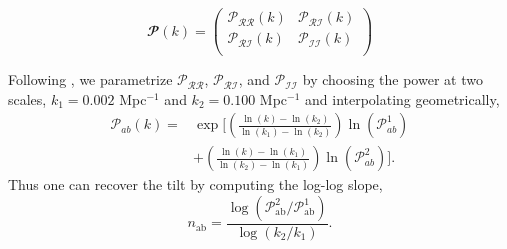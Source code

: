 \documentclass{emulateapj}
\newcommand{\prr}{ \mathcal{P}_{\mathcal{R}\mathcal{R}} }
\newcommand{\pri}{ \mathcal{P}_{\mathcal{R}\mathcal{I}} }
\newcommand{\pii}{ \mathcal{P}_{\mathcal{I}\mathcal{I}} }
\begin{document}
\begin{equation}
\mathbfcal{P}(k) = \left( {\begin{array}{cc}
   \prr(k) & \pri(k) \\
   \pri(k) &  \pii(k) \\
  \end{array} } \right)
\end{equation}

Following \cite{planckXX:2015}, we parametrize $\prr$, $\pri$, and $\pii$ by choosing the power at two scales, $k_1 = 0.002$ Mpc$^{-1}$ and $k_2 = 0.100$ Mpc$^{-1}$ and interpolating geometrically,
\begin{align*}
\mathcal{P}_{ab}(k) = & \exp \bigg[ \left( \frac{\ln(k) - \ln(k_2)}{\ln(k_1) - \ln(k_2)}\right) \ln \left( \mathcal{P}_{ab}^1 \right) \\
& +
\left( \frac{\ln(k) - \ln(k_1)}{\ln(k_2) - \ln(k_1)}\right) \ln \left( \mathcal{P}_{ab}^2 \right) \bigg].
\end{align*}
Thus one can recover the tilt by computing the log-log slope,
\begin{equation} n_{\text{ab}}  =  \frac{\log( \mathcal{P}_{\text{ab}}^2 / \mathcal{P}_{\text{ab}}^1 )}{\log ( k_2 / k_1 )}. \end{equation}
\end{document}
